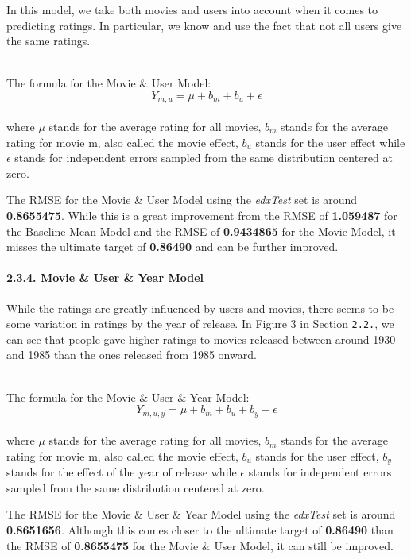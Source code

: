 \documentclass[
]{article}
\begin{document}
\hfill\break
\hfill\break
In this model, we take both movies and users into account when it comes
to predicting ratings. In particular, we know and use the fact that not
all users give the same ratings.\\
\strut \\
The formula for the Movie \& User Model:\\
\[Y_{m, u} = \mu+b_{m}+b_{u}+ \epsilon\]\\
where \(\mu\) stands for the average rating for all movies, \(b_m\)
stands for the average rating for movie m, also called the movie effect,
\(b_u\) stands for the user effect while \(\epsilon\) stands for
independent errors sampled from the same distribution centered at zero.

The RMSE for the Movie \& User Model using the \emph{edxTest} set is
around \textbf{0.8655475}. While this is a great improvement from the
RMSE of \textbf{1.059487} for the Baseline Mean Model and the RMSE of
\textbf{0.9434865} for the Movie Model, it misses the ultimate target of
\textbf{0.86490} and can be further improved.

\hypertarget{movie-user-year-model}{%
\paragraph{2.3.4. Movie \& User \& Year
Model}\label{movie-user-year-model}}

\hfill\break
\hfill\break
While the ratings are greatly influenced by users and movies, there
seems to be some variation in ratings by the year of release. In Figure
3 in Section \texttt{2.2.}, we can see that people gave higher ratings
to movies released between around 1930 and 1985 than the ones released
from 1985 onward.\\
\strut \\
The formula for the Movie \& User \& Year Model:~
\[Y_{m, u, y} = \mu+b_{m}+b_{u}+b_{y}+ \epsilon\]\\
where \(\mu\) stands for the average rating for all movies, \(b_m\)
stands for the average rating for movie m, also called the movie effect,
\(b_u\) stands for the user effect, \(b_y\) stands for the effect of the
year of release while \(\epsilon\) stands for independent errors sampled
from the same distribution centered at zero.

The RMSE for the Movie \& User \& Year Model using the \emph{edxTest}
set is around \textbf{0.8651656}. Although this comes closer to the
ultimate target of \textbf{0.86490} than the RMSE of \textbf{0.8655475}
for the Movie \& User Model, it can still be improved.
\end{document}
